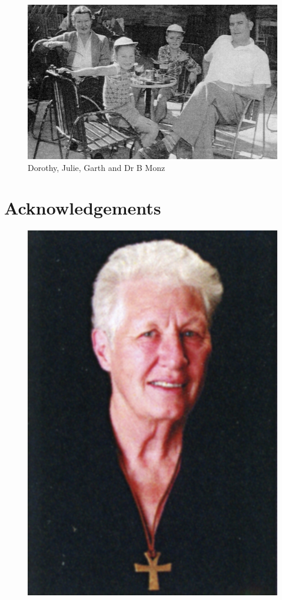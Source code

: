 \begin{figure}
\begin{center}
\includegraphics[width=1.\linewidth,center]{../images/monz.jpg}
\caption{Dorothy, Julie, Garth and Dr B Monz}
\end{center}
\end{figure}


\balance


\printendnotes[custom]
\setcounter{endnote}{0}
\chapter{Acknowledgements}
\nobalance








\begin{figure}
\begin{center}
\includegraphics[width=.8\linewidth,center]{../images/theAuthor.jpg}
\caption{ }
\end{center}
\end{figure}




